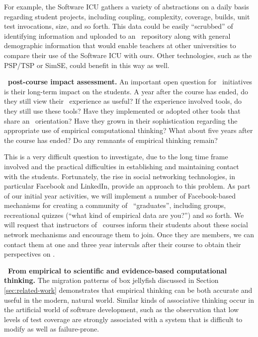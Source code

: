 For example, the Software ICU gathers a variety of abstractions on a daily
basis regarding student projects, including coupling, complexity, coverage,
builds, unit test invocations, size, and so forth.  This data could be
easily ``scrubbed'' of identifying information and uploaded to an \eCT\
repository along with general demographic information that would enable
teachers at other universities to compare their use of the Software ICU
with ours.  Other technologies, such as the PSP/TSP or SimSE, could benefit
in this way as well.

{\bf \eCT\ post-course impact assessment.}  An important open question for
\eCT\ initiatives is their long-term impact on the students.  A year after
the course has ended, do they still view their \eCT\ experience as useful?
If the experience involved tools, do they still use these tools?  Have they
implemented or adopted other tools that share an \eCT\ orientation?  Have
they grown in their sophistication regarding the appropriate use of
empirical computational thinking? What about five years after the course
has ended?  Do any remnants of empirical thinking remain?

This is a very difficult question to investigate, due to the long time
frame involved and the practical difficulties in establishing and
maintaining contact with the students.  Fortunately, the rise in social
networking technologies, in particular Facebook and LinkedIn, provide an approach to
this problem.  As part of our initial year activities, we will implement a
number of Facebook-based mechanisms for creating a community of \eCT\
``graduates'', including groups, recreational quizzes (``what kind of
empirical data are you?'') and so forth.  We will request that instructors
of \eCT\ courses inform their students about these social network
mechanisms and encourage them to join.  Once they are members, we can
contact them at one and three year intervals after their course to obtain
their perspectives on \eCT.

{\bf \eCT\ From empirical to scientific and evidence-based computational
thinking.}  The migration patterns of box jellyfish discussed in Section
\ref{sec:related-work} demonstrates that empirical thinking can be both
accurate and useful in the modern, natural world. Similar kinds of
associative thinking occur in the artificial world of software development,
such as the observation that low levels of test coverage are strongly
associated with a system that is difficult to modify as well as
failure-prone.

